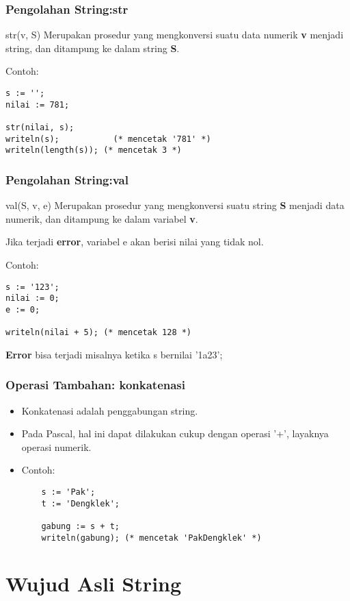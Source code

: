 \documentclass{beamer}
\begin{document}
\begin{frame}[fragile]
\frametitle{Pengolahan String:\newline str}
\begin{block}{str(v, S)}
Merupakan prosedur yang mengkonversi suatu data numerik \textbf{v} menjadi string, dan ditampung ke dalam string \textbf{S}.
\end{block}
Contoh:
\begin{lstlisting}
s := '';
nilai := 781;

str(nilai, s);
writeln(s);           (* mencetak '781' *)
writeln(length(s)); (* mencetak 3 *)
\end{lstlisting}
\end{frame}

\begin{frame}[fragile]
\frametitle{Pengolahan String:\newline val}
\begin{block}{val(S, v, e)}
Merupakan prosedur yang mengkonversi suatu string \textbf{S} menjadi data numerik, dan ditampung ke dalam variabel \textbf{v}.

Jika terjadi \textbf{error}, variabel e akan berisi nilai yang tidak nol.
\end{block}
Contoh:
\begin{lstlisting}
s := '123';
nilai := 0;
e := 0;

writeln(nilai + 5); (* mencetak 128 *)
\end{lstlisting}

\textbf{Error} bisa terjadi misalnya ketika s bernilai '1a23';
\end{frame}

\begin{frame}[fragile]
\frametitle{Operasi Tambahan: konkatenasi}
\begin{itemize}
	\item Konkatenasi adalah penggabungan string.
	\item Pada Pascal, hal ini dapat dilakukan cukup dengan operasi '+', layaknya operasi numerik.
	\item Contoh:
	\begin{lstlisting}
	s := 'Pak';
	t := 'Dengklek';
	
	gabung := s + t;
	writeln(gabung); (* mencetak 'PakDengklek' *)
	\end{lstlisting}
\end{itemize}
\end{frame}


\section{Wujud Asli String}
\frame{\sectionpage}
\end{document}
